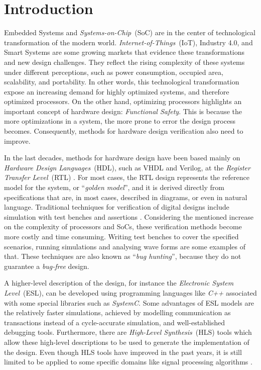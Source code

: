 \chapter{Introduction}

Embedded Systems and \textit{Systems-on-Chip}~(SoC) are in the center of technological transformation of the modern world. \textit {Internet-of-Things}~(IoT), Industry 4.0, and Smart Systems are some growing markets that evidence these transformations and new design challenges. They reflect the rising complexity of these systems under different perceptions, such as power consumption, occupied area, scalability, and portability. In other words, this technological transformation expose an increasing demand for highly optimized systems, and therefore optimized processors. On the other hand, optimizing processors highlights an important concept of hardware design: \textit{Functional Safety}. This is because the more optimizations in a system, the more prone to error the design process becomes. Consequently, methods for hardware design verification also need to improve.

In the last decades, methods for hardware design have been based mainly on \textit{Hardware Design Languages}~(HDL), such as VHDL and Verilog, at the \textit{Register Transfer Level}~(RTL) \cite{paper-pdd}. For most cases, the RTL design represents the reference model for the system, or “\textit{golden model}”, and it is derived directly from specifications that are, in most cases, described in diagrams, or even in natural language. Traditional techniques for verification of digital designs include simulation with test benches and assertions \cite{paper-symbolic}. Considering the mentioned increase on the complexity of processors and SoCs, these verification methods become more costly and time consuming. Writing test benches to cover the specified scenarios, running simulations and analysing wave forms are some examples of that. These techniques are also known as “\textit{bug hunting}”, because they do not guarantee a \textit{bug-free} design. 

A higher-level description of the design, for instance the \textit{Electronic System Level}~(ESL), can be developed using programming languages like \textit{C++} associated with some special libraries such as \textit{SystemC}. Some advantages of ESL models are the relatively faster simulations, achieved by modelling communication as transactions instead of a cycle-accurate simulation, and well-established debugging tools. Furthermore, there are \textit{High-Level Synthesis}~(HLS) tools which allow these high-level descriptions to be used to generate the implementation of the design. Even though HLS tools have improved in the past years, it is still limited to be applied to some specific domains like signal processing algorithms \cite{paper-pdd}. 

